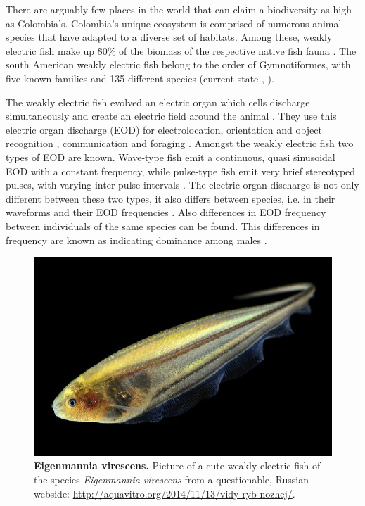 There  are  arguably  few  places  in  the  world  that  can  claim  a biodiversity as high as Colombia’s. Colombia’s unique ecosystem is comprised of numerous animal species that have adapted to a diverse set of habitats. Among these, weakly electric fish make up \~80\%  of the biomass of the respective native fish fauna \citep{marrero1991notas}. The south American weakly electric fish belong to the order of Gymnotiformes, with five known families and 135 different species (current state \citeyear{albert2005diversity}, \citeauthor{albert2005diversity}).

The weakly electric fish evolved an electric organ which cells discharge simultaneously and create an electric field around the animal \citep{Zupanc_Bullock_2005}. They use this electric organ discharge (EOD) for electrolocation, orientation and object recognition \citep{Heiligenberg_73}, communication \citep{Hopkins_74} and foraging \citep{Nelson_MacIver_1999}. Amongst the weakly electric fish two types of EOD are known. Wave-type fish emit a continuous, quasi sinusoidal EOD with a constant frequency, while pulse-type fish emit very brief stereotyped pulses, with varying inter-pulse-intervals \citep{Zupanc_Bullock_2005}.
The electric organ discharge is 
not only different between these two types, it also differs between species, i.e. in their waveforms and their EOD frequencies \citep{Zupanc_Bullock_2005}.
Also differences in EOD frequency between individuals of the same species can be found. This differences in frequency are known as indicating dominance among males \citep{HAGEDORN1985}.\\

\begin{figure}
    \centering
    \includegraphics[width = \textwidth]{pictures/Eigenmannia_virescens.jpg}
    \caption{\textbf{Eigenmannia virescens.} Picture of a cute weakly electric fish of the species \textit{Eigenmannia virescens} from a questionable, Russian webside: \url{http://aquavitro.org/2014/11/13/vidy-ryb-nozhej/}.}
    \label{fig:eigenmannia_cute}
\end{figure}


